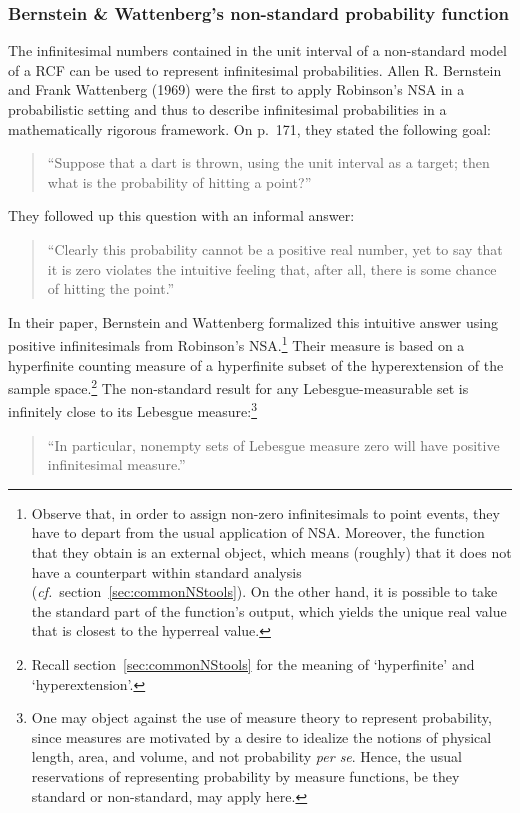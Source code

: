 \subsubsection{Bernstein \& Wattenberg's non-standard probability function}
The infinitesimal numbers contained in the unit interval of a non-standard model of a RCF can be used to represent infinitesimal probabilities. Allen R. Bernstein and Frank Wattenberg (1969) were the first to apply Robinson's NSA in a probabilistic setting and thus to describe infinitesimal probabilities in a mathematically rigorous framework. On p.~171, they stated the following goal:
\begin{quote}
``Suppose that a dart is thrown, using the unit interval as a target; then what is the probability of hitting a point?''
\end{quote}
They followed up this question with an informal answer:
\begin{quote}
``Clearly this probability cannot be a positive real number, yet to say that it is zero violates the intuitive feeling that, after all, there is some chance of hitting the point.''
\end{quote}
In their paper, Bernstein and Wattenberg formalized this intuitive answer using positive infinitesimals from Robinson's NSA.\footnote{Observe that, in order to assign non-zero infinitesimals to point events, they have to depart from the usual application of NSA. Moreover, the function that they obtain is an external object, which means (roughly) that it does not have a counterpart within standard analysis (\textit{cf.}\ section~\ref{sec:commonNStools}). On the other hand, it is possible to take the standard part of the function's output, which yields the unique real value that is closest to the hyperreal value.}
Their measure is based on a hyperfinite counting measure of a hyperfinite subset of the hyperextension of the sample space.\footnote{Recall section~\ref{sec:commonNStools} for the meaning of `hyperfinite' and `hyperextension'.}
The non-standard result for any Lebesgue-measurable set is infinitely close to its Lebesgue measure:\footnote{One may object against the use of measure theory to represent probability, since measures are motivated by a desire to idealize the notions of physical length, area, and volume, and not probability \textit{per se}. Hence, the usual reservations of representing probability by measure functions, be they standard or non-standard, may apply here.}
\begin{quote}
``In particular, nonempty sets of Lebesgue measure zero will have positive infinitesimal measure.''
\end{quote}
